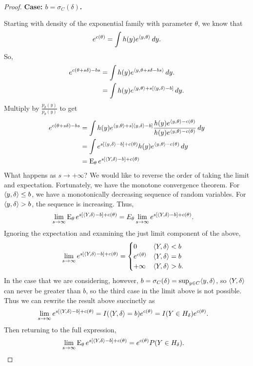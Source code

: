 \begin{proof}
\textbf{Case: $b = \sigma_C(\delta)$.}

Starting with density of the exponential family with parameter $\theta$, we know that
\begin{align*}
	e^{c(\theta)} = \int h(y) e^{\langle y,\theta \rangle} \, dy.
\end{align*}
So,
\begin{align*}
	e^{ c(\theta + s \delta ) - bs } &= \int h(y) e^{\langle y,\theta + s \delta - 
bs \rangle } \, dy. \\
									&= \int h(y) e^{\langle y,\theta \rangle  + s [ \langle y,\delta \rangle - b ] } \, dy. 
\end{align*}
Multiply by $\frac{p_\theta(y)}{p_\theta(y)}$ to get
\begin{align*}
	e^{ c(\theta + s \delta ) - bs } &= \int h(y) e^{\langle y,\theta \rangle  + s [ \langle y,\delta \rangle - b ] }  \frac{ h(y)e^{\langle y, \theta \rangle - c(\theta)} }{ h(y)e^{\langle y, 
\theta \rangle - c(\theta)} }\, dy \\
	&= \int e^{  s [ \langle y,\delta \rangle - b ] + c(\theta) }  h(y)e^{\langle y, \theta \rangle - 
c(\theta)} \, dy \\
	&= \operatorname{E}_\theta e^{  s [ \langle Y,\delta \rangle - b ] + c(\theta) }
\end{align*}
What happens as $s \to +\infty$?  We would like to reverse the order of taking the 
limit and expectation.  Fortunately, we have the monotone convergence theorem.  For $
\langle y, \delta \rangle \leq b$, we have a monotonically decreasing sequence of random 
variables.  For $\langle y, \delta \rangle > b$, the sequence is increasing.  Thus,
\begin{align*}
	\lim_{s\to \infty} \operatorname{E}_\theta e^{  s [ \langle Y,\delta \rangle - b ] + c(\theta) } &= E_
\theta \lim_{s\to \infty} e^{  s [ \langle Y,\delta \rangle - b ] + c(\theta) }. 
\end{align*}
Ignoring the expectation and examining the just limit component of the above,
\begin{align*}
	\lim_{s\to \infty} e^{  s [ \langle Y,\delta \rangle - b ] + c(\theta) } &= 
			\begin{cases} 
			0 								& \langle Y,\delta \rangle < b \\
			e^{c(\theta)} 		 			& \langle Y,\delta \rangle = b \\
			+\infty							& \langle Y,\delta \rangle > b.
		\end{cases}
\end{align*}
In the case that we are considering, however, $b = \sigma_C(\delta) = \sup_{y \in C}
\langle y,\delta \rangle$, so $\langle Y,\delta \rangle$ can never be greater than $b$, so the third 
case in the limit above is not possible.  Thus we can rewrite the result above 
succinctly as
\begin{align*}
	\lim_{s\to \infty} e^{  s [ \langle Y,\delta \rangle - b ] + c(\theta) } &= I(\langle Y,
\delta \rangle = b ) e^{c(\theta)} 
	= I( Y \in H_\delta ) e^{c(\theta)}.
\end{align*}
Then returning to the full expression,
\begin{align*}
	\lim_{s\to \infty} \operatorname{E}_\theta e^{  s [ \langle Y,\delta \rangle - b ] + c(\theta) } &= e^
{c(\theta)} P( Y \in H_\delta ).
\end{align*}


\end{proof}
